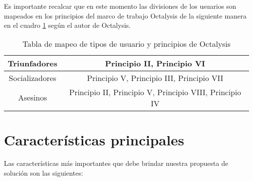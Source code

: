  Es importante recalcar que en este momento las divisiones de los usuarios son mapeados en los principios
 del marco de trabajo Octalysis de la siguiente manera en el cuadro \ref{table:usuariosvprincipios} según
 el autor de Octalysis\cite[p. 414]{Octalysis}.
    
    \begin{table}[h!]
    \centering
    \begin{tabular}{|c|c|} \hline
        Triunfadores & Principio II, Principio VI \\ \hline
        Socializadores &  Principio V, Principio III, Principio VII\\\hline
        Asesinos & Principio II, Principio V, Principio VIII, Principio IV \\\hline
    \end{tabular}
    \caption{Tabla de mapeo de tipos de usuario y principios de Octalysis}
    \label{table:usuariosvprincipios}
    \end{table}


\section{Características principales}


 Las características más
 importantes que debe brindar nuestra propuesta de solución son las siguientes:

